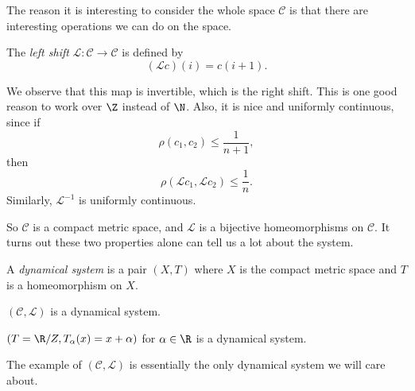 \documentclass[a4paper]{article}
\begin{document}
The reason it is interesting to consider the whole space $\mathcal{C}$ is that there are interesting operations we can do on the space.
\begin{defi}
  The \emph{left shift} $\mathcal{L}: \mathcal{C} \to \mathcal{C}$ is defined by
  \[
    (\mathcal{L}c)(i) = c(i + 1).
  \]
\end{defi}
\begin{center}
\end{center}
We observe that this map is invertible, which is the right shift. This is one good reason to work over $\Z$ instead of $\N$. Also, it is nice and uniformly continuous, since if
\[
  \rho(c_1, c_2) \leq \frac{1}{n + 1},
\]
then
\[
  \rho(\mathcal{L} c_1, \mathcal{L} c_2) \leq \frac{1}{n}.
\]
Similarly, $\mathcal{L}^{-1}$ is uniformly continuous.

So $\mathcal{C}$ is a compact metric space, and $\mathcal{L}$ is a bijective homeomorphisms on $\mathcal{C}$. It turns out these two properties alone can tell us a lot about the system.

\begin{defi}
  A \emph{dynamical system} is a pair $(X, T)$ where $X$ is the compact metric space and $T$ is a homeomorphism on $X$.
\end{defi}

\begin{eg}
  $(\mathcal{C}, \mathcal{L})$ is a dynamical system.
\end{eg}

\begin{eg}
  $(T = \R/Z, T_\alpha(x) = x + \alpha)$ for $\alpha \in \R$ is a dynamical system.
\end{eg}

The example of $(\mathcal{C}, \mathcal{L})$ is essentially the only dynamical system we will care about.
\end{document}
